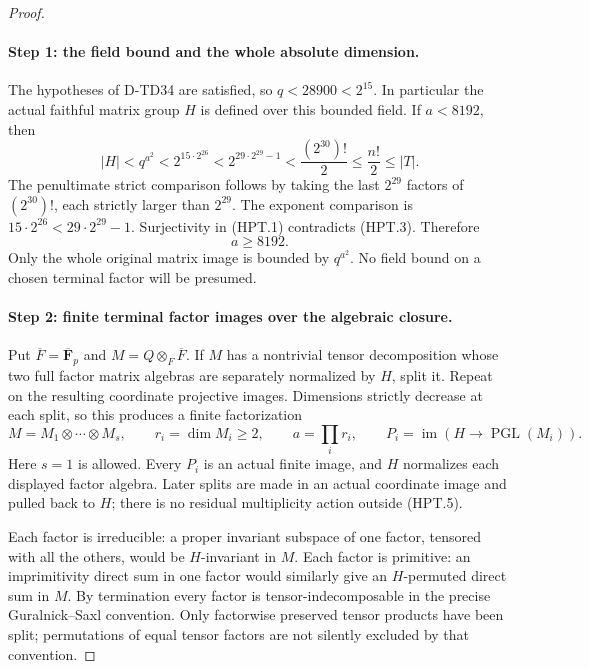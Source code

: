 \begin{proof}
\paragraph{Step 1: the field bound and the whole absolute dimension.}
The hypotheses of D-TD34 are satisfied, so $q<28900<2^{15}$.
In particular the actual faithful matrix group $H$ is defined over
this bounded field.  If $a<8192$, then
\[
 |H|<q^{a^2}<2^{15\cdot2^{26}}
       <2^{29\cdot2^{29}-1}
       <\frac{(2^{30})!}{2}\le\frac{n!}{2}\le|T|.
 \tag{HPT.3}
\]
The penultimate strict comparison follows by taking the last
$2^{29}$ factors of $(2^{30})!$, each strictly larger than $2^{29}$.
The exponent comparison is $15\cdot2^{26}<29\cdot2^{29}-1$.
Surjectivity in (HPT.1) contradicts (HPT.3).  Therefore
\[
                            a\ge8192.
 \tag{HPT.4}
\]
Only the whole original matrix image is bounded by $q^{a^2}$.
No field bound on a chosen terminal factor will be presumed.

\paragraph{Step 2: finite terminal factor images over the algebraic closure.}
Put $\overline F=\overline{\mathbf F}_p$ and
$M=Q\otimes_F\overline F$.  If $M$ has a nontrivial tensor
decomposition whose two full factor matrix algebras are separately
normalized by $H$, split it.  Repeat on the resulting coordinate
projective images.  Dimensions strictly decrease at each split,
so this produces a finite factorization
\[
 M=M_1\otimes\cdots\otimes M_s,\qquad
 r_i=\dim M_i\ge2,\qquad a=\prod_i r_i,\qquad
 P_i=\operatorname{im}(H\to\operatorname{PGL}(M_i)).
 \tag{HPT.5}
\]
Here $s=1$ is allowed.  Every $P_i$ is an actual finite image,
and $H$ normalizes each displayed factor algebra.  Later splits
are made in an actual coordinate image and pulled back to $H$;
there is no residual multiplicity action outside (HPT.5).

Each factor is irreducible: a proper invariant subspace of one
factor, tensored with all the others, would be $H$-invariant in
$M$.  Each factor is primitive: an imprimitivity direct sum in
one factor would similarly give an $H$-permuted direct sum in
$M$.  By termination every factor is tensor-indecomposable in
the precise Guralnick--Saxl convention.  Only factorwise preserved
tensor products have been split; permutations of equal tensor
factors are not silently excluded by that convention.


\end{proof}
